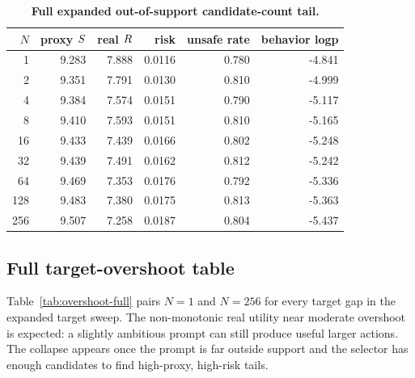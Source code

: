 \begin{table}[t]
\centering
\small
\caption{\textbf{Full expanded out-of-support candidate-count tail.}}
\label{tab:full-tail}
\begin{tabular}{rrrrrr}
\toprule
$N$ & proxy $S$ & real $R$ & risk & unsafe rate & behavior logp \\
\midrule
1 & 9.283 & 7.888 & 0.0116 & 0.780 & -4.841 \\
2 & 9.351 & 7.791 & 0.0130 & 0.810 & -4.999 \\
4 & 9.384 & 7.574 & 0.0151 & 0.790 & -5.117 \\
8 & 9.410 & 7.593 & 0.0151 & 0.810 & -5.165 \\
16 & 9.433 & 7.439 & 0.0166 & 0.802 & -5.248 \\
32 & 9.439 & 7.491 & 0.0162 & 0.812 & -5.242 \\
64 & 9.469 & 7.353 & 0.0176 & 0.792 & -5.336 \\
128 & 9.483 & 7.380 & 0.0175 & 0.813 & -5.363 \\
256 & 9.507 & 7.258 & 0.0187 & 0.804 & -5.437 \\
\bottomrule
\end{tabular}
\end{table}

\subsection{Full target-overshoot table}

Table~\ref{tab:overshoot-full} pairs $N=1$ and $N=256$ for every target gap in the expanded target sweep. The non-monotonic real utility near moderate overshoot is expected: a slightly ambitious prompt can still produce useful larger actions. The collapse appears once the prompt is far outside support and the selector has enough candidates to find high-proxy, high-risk tails.

